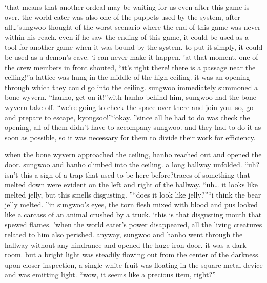 ‘that means that another ordeal may be waiting for us even after this game is over.
 the world eater was also one of the puppets used by the system, after all…’sungwoo thought of the worst scenario where the end of this game was never within his reach.
 even if he saw the ending of this game, it could be used as a tool for another game when it was bound by the system.
 to put it simply, it could be used as a demon’s cave.
‘i can never make it happen.
’at that moment, one of the crew members in front shouted, “it’s right there! there is a passage near the ceiling!”a lattice was hung in the middle of the high ceiling.
 it was an opening through which they could go into the ceiling.
 sungwoo immediately summoned a bone wyvern.
“hanho, get on it!”with hanho behind him, sungwoo had the bone wyvern take off.
“we’re going to check the space over there and join you.
 so, go and prepare to escape, kyongsoo!”“okay.
”since all he had to do was check the opening, all of them didn’t have to accompany sungwoo.
 and they had to do it as soon as possible, so it was necessary for them to divide their work for efficiency.


when the bone wyvern approached the ceiling, hanho reached out and opened the door.
 sungwoo and hanho climbed into the ceiling.
 a long hallway unfolded.
“uh? isn’t this a sign of a trap that used to be here before?traces of something that melted down were evident on the left and right of the hallway.
“uh… it looks like melted jelly, but this smells disgusting.
”“does it look like jelly?”“i think the bear jelly melted.
”in sungwoo’s eyes, the torn flesh mixed with blood and pus looked like a carcass of an animal crushed by a truck.
‘this is that disgusting mouth that spewed flames.
’when the world eater’s power disappeared, all the living creatures related to him also perished.
 anyway, sungwoo and hanho went through the hallway without any hindrance and opened the huge iron door.
it was a dark room.
 but a bright light was steadily flowing out from the center of the darkness.
upon closer inspection, a single white fruit was floating in the square metal device and was emitting light.
“wow, it seems like a precious item, right?”

 